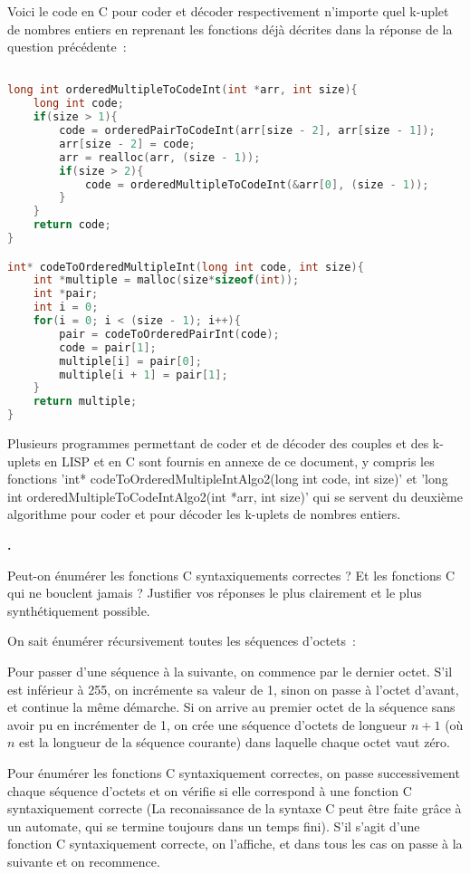 \documentclass{article}
\newcounter{enoncecount}
\newenvironment{enonce}
{
\stepcounter{enoncecount}
\bf\small \arabic{enoncecount}.
\begin{bf}
}
{
\end{bf}
}
\begin{document}
Voici le code en C pour coder et décoder respectivement n'importe quel k-uplet de nombres entiers en reprenant les fonctions déjà décrites
dans la réponse de la question précédente~:

\begin{lstlisting}[language=C]

long int orderedMultipleToCodeInt(int *arr, int size){
	long int code;	
	if(size > 1){
		code = orderedPairToCodeInt(arr[size - 2], arr[size - 1]);
		arr[size - 2] = code;
		arr = realloc(arr, (size - 1));
		if(size > 2){		
			code = orderedMultipleToCodeInt(&arr[0], (size - 1));
		}
	}
	return code;
}

int* codeToOrderedMultipleInt(long int code, int size){
	int *multiple = malloc(size*sizeof(int));
	int *pair;
	int i = 0;
	for(i = 0; i < (size - 1); i++){
		pair = codeToOrderedPairInt(code);
		code = pair[1];
		multiple[i] = pair[0];
		multiple[i + 1] = pair[1];
	}
	return multiple;
}

\end{lstlisting}


Plusieurs programmes permettant de coder et de décoder des couples et des k-uplets en LISP et en C sont fournis en annexe de ce document, y
compris les fonctions 'int* codeToOrderedMultipleIntAlgo2(long int code, int size)' et 'long int orderedMultipleToCodeIntAlgo2(int *arr, int
size)' qui se servent du deuxième algorithme pour coder et pour décoder les k-uplets de nombres entiers.


\begin{enonce}
  Peut-on énumérer les fonctions C syntaxiquements correctes ? Et les fonctions C qui ne bouclent jamais ? Justifier vos réponses le plus
  clairement et le plus synthétiquement possible.
\end{enonce}

On sait énumérer récursivement toutes les séquences d'octets~:

Pour passer d'une séquence à la suivante, on commence par le dernier octet. S'il est inférieur à 255, on incrémente sa valeur de 1, sinon on passe à l'octet d'avant, et continue la même démarche. Si on arrive au premier octet de la séquence sans avoir pu en incrémenter de 1, on crée une séquence d'octets de longueur $n + 1$ (où $n$ est la longueur de la séquence courante) dans laquelle chaque octet vaut zéro.

Pour énumérer les fonctions C syntaxiquement correctes, on passe successivement chaque séquence d'octets et on vérifie si elle correspond à une fonction C syntaxiquement correcte (La reconaissance de la syntaxe C peut être faite grâce à un automate, qui se termine toujours dans un temps fini). S'il s'agit d'une fonction C syntaxiquement correcte, on l'affiche, et dans tous les cas on passe à la suivante et on recommence.
\end{document}

